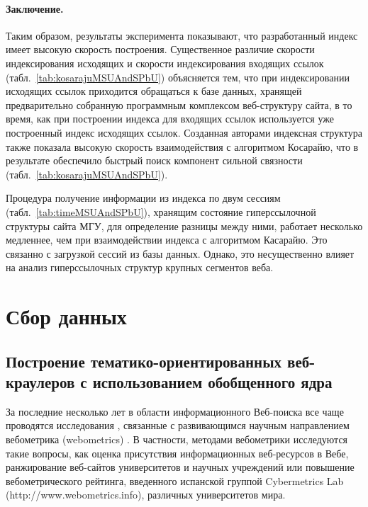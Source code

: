 \paragraph{Заключение.} Таким образом, результаты эксперимента показывают, что разработанный индекс имеет высокую скорость построения. Существенное различие скорости индексирования исходящих и скорости индексирования входящих ссылок (табл.~\cref{tab:kosarajuMSUAndSPbU}) объясняется тем, что при индексировании исходящих ссылок приходится обращаться к базе данных, хранящей предварительно собранную программным комплексом веб-структуру сайта, в то время, как при построении индекса для входящих ссылок используется уже построенный индекс исходящих ссылок. Созданная авторами индексная структура также показала высокую скорость взаимодействия с алгоритмом Косарайю, что в результате обеспечило быстрый поиск компонент сильной связности (табл.~\cref{tab:kosarajuMSUAndSPbU}).
	
Процедура получение информации из индекса по двум сессиям (табл.~\cref{tab:timeMSUAndSPbU}), хранящим состояние гиперссылочной структуры сайта МГУ, для определение разницы между ними, работает несколько медленнее, чем при взаимодействии индекса с алгоритмом Касарайю. Это связанно с загрузкой сессий из базы данных. Однако, это несущественно влияет на анализ гиперссылочных структур крупных сегментов веба.

\section{Сбор данных}\label{sec:ch1/sec3}

\subsection{Построение тематико-ориентированных веб-краулеров с использованием обобщенного ядра}\label{subsec:ch1/sec3/sub1}

За последние несколько лет в области информационного Веб-поиска все чаще проводятся исследования \cite{Pechnikov,PechnikovLugovayaChuiko,PechnikovChirkovChuiko}, связанные с развивающимся научным направлением вебометрика (webometrics) \cite{PechnikovLugovayaChuiko}. В частности, методами вебометрики исследуются такие вопросы, как оценка присутствия информационных веб-ресурсов в Вебе, ранжирование веб-сайтов университетов и научных учреждений \cite{Pechnikov,PechnikovChirkovChuiko} или повышение вебометрического рейтинга, введенного испанской группой Cybermetrics Lab (http://www.webometrics.info), различных университетов мира.

